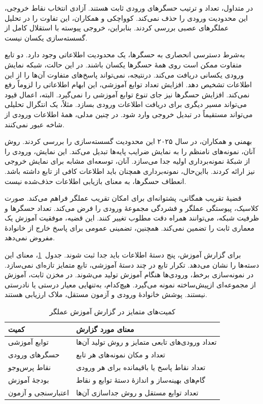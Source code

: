 در  متداول، تعداد و ترتیب حسگرهای ورودی ثابت هستند.
آزادی انتخاب نقاط خروجی، این محدودیت ورودی را حذف نمی‌کند.
کوواچکی و همکاران، این تفاوت را در تحلیل عملگرهای عصبی بررسی کردند.
بنابراین، خروجی پیوسته با استقلال کامل از گسسته‌سازی یکسان نیست.
\cite{Kovachki2023NeuralOperator}

به‌شرط دسترسی انحصاری به حسگرها، یک محدودیت اطلاعاتی وجود دارد.
دو تابع متفاوت ممکن است روی همهٔ حسگرها یکسان باشند.
در این حالت، شبکه نمایش ورودی یکسانی دریافت می‌کند.
درنتیجه، نمی‌تواند پاسخ‌های متفاوت آن‌ها را از این اطلاعات تشخیص دهد.
افزایش تعداد توابع آموزشی، این ابهام اطلاعاتی را لزوماً رفع نمی‌کند.
افزایش حسگرها نیز جای تنوع توابع آموزشی را نمی‌گیرد.
البته، اعمال قیود می‌تواند مسیر دیگری برای دریافت اطلاعات ورودی بسازد.
مثلاً، یک انتگرال تحلیلی می‌تواند مستقیماً در تبدیل خروجی وارد شود.
در چنین مدلی، همهٔ اطلاعات ورودی از شاخه عبور نمی‌کنند.

بهمنی و همکاران، در سال ۲۰۲۵ این محدودیت گسسته‌سازی را بررسی کردند.
روش آنان، نمونه‌های نامنظم را به نمایش ضرایب پایه‌ها تبدیل می‌کند.
این نمایش، ورودی  را از شبکهٔ نمونه‌برداری اولیه جدا می‌سازد.
آنان، توسعه‌ای مشابه برای نمایش خروجی نیز ارائه کردند.
بااین‌حال، نمونه‌برداری همچنان باید اطلاعات کافی از تابع داشته باشد.
انعطاف حسگرها، به معنای بازیابی اطلاعات حذف‌شده نیست.
\cite{Bahmani2025RINO}

قضیهٔ تقریب همگانی، پشتوانه‌ای برای امکان تقریب عملگر فراهم می‌کند.
صورت کلاسیک، پیوستگی عملگر و فشردگی مجموعهٔ ورودی را فرض می‌کند.
تعداد حسگرها و ظرفیت شبکه، می‌توانند همراه دقت مطلوب تغییر کنند.
این قضیه، موفقیت آموزش یک معماری ثابت را تضمین نمی‌کند.
همچنین، تضمینی عمومی برای پاسخ خارج از خانوادهٔ مفروض نمی‌دهد.
\cite{lu2021deeponet}

برای گزارش آموزش، پنج دستهٔ اطلاعات باید جدا ثبت شوند.
جدول~\ref{tab:lit-operator-counts}، معنای این دسته‌ها را نشان می‌دهد.
تکرار تابع در چند دستهٔ آموزشی، تابع متمایز تازه‌ای نمی‌سازد.
در نمونه‌سازی برخط، ورودی‌ها هنگام آموزش تولید می‌شوند.
در مخزن ثابت، آموزش از مجموعه‌ای ازپیش‌ساخته نمونه می‌گیرد.
هیچ‌کدام، به‌تنهایی معیار درستی یا نادرستی  نیستند.
پوشش خانوادهٔ ورودی و آزمون مستقل، ملاک ارزیابی هستند.

\begin{table}[htbp]
\centering
\caption{کمیت‌های متمایز در گزارش آموزش عملگر}
\label{tab:lit-operator-counts}
\begin{tabular}{p{}p{}}
\hline
کمیت & معنای مورد گزارش \\
\hline
توابع آموزشی & تعداد ورودی‌های تابعی متمایز و روش تولید آن‌ها \\
حسگرهای ورودی & تعداد و مکان نمونه‌های هر تابع \\
نقاط پرس‌وجو & تعداد نقاط پاسخ یا باقیمانده برای هر ورودی \\
بودجهٔ آموزش & گام‌های بهینه‌ساز و اندازهٔ دستهٔ توابع و نقاط \\
اعتبارسنجی و آزمون & تعداد توابع مستقل و روش جداسازی آن‌ها \\
\hline
\end{tabular}
\end{table}

